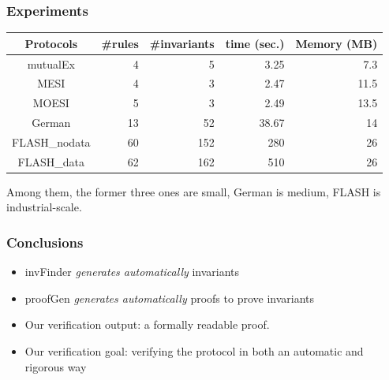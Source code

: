 \documentclass{beamer}
\begin{document}
\begin{frame}\frametitle{Experiments}
\begin{table}[!t]
\centering
\vspace{-8pt}
\begin{tabular}{|c|r|r|r|r|}
\hline
Protocols &  \#rules & \#invariants & time (sec.) & Memory (MB) \\
\hline\hline
mutualEx & 4& 5 & 3.25 & 7.3  \\
\hline
MESI & 4& 3 & 2.47 & 11.5  \\
\hline
MOESI &  5& 3 &2.49 & 13.5  \\
\hline
German  & 13 & 52 & 38.67 & 14  \\
\hline
FLASH\_nodata & 60 & 152 & 280 & 26  \\
\hline
FLASH\_data & 62 & 162 & 510 & 26  \\
\hline
\end{tabular}
\end{table}

Among them, the former three ones are small, German is medium, FLASH is industrial-scale.
\end{frame}

\begin{frame}\frametitle{Conclusions}

\begin{itemize}
\item   {\sf invFinder}   \emph{generates automatically }  invariants

\item   {\sf proofGen}     \emph{generates automatically } proofs to prove invariants

 \item Our verification output: a formally readable proof.

 \item  Our verification goal:  verifying the protocol in both an automatic and rigorous way
\end{itemize}
\end{frame}
\end{document}
